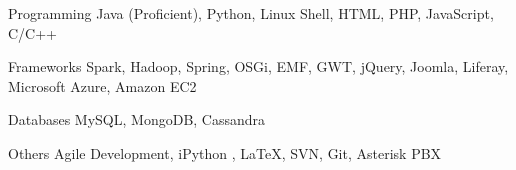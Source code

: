 

\begin{cvskills}

  \cvskill
    {Programming} %
    {Java (Proficient), Python, Linux Shell, HTML, PHP, JavaScript, C/C++} %

  \cvskill
    {Frameworks} %
    {Spark, Hadoop, Spring, OSGi, EMF, GWT, jQuery, Joomla, Liferay, Microsoft Azure, Amazon EC2} %

  \cvskill
    {Databases} %
    {MySQL, MongoDB, Cassandra} %


  \cvskill
  {Others} %
  {Agile Development, iPython , {\LaTeX}, SVN, Git, Asterisk PBX} %
  
\end{cvskills}

